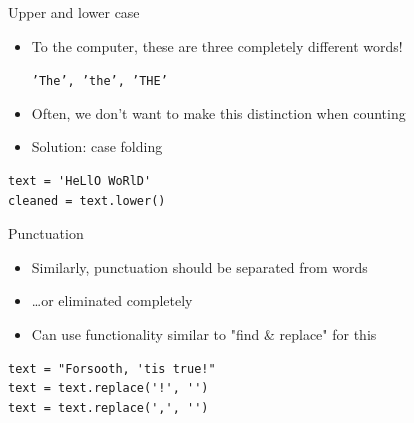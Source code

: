 \documentclass[aspectratio=169,usenames,dvipsnames]{beamer}
\begin{document}
% 
% 
% 
% 

\begin{frame}[fragile]{Upper and lower case}
    \begin{itemize}
        \item To the computer, these
            are three completely different words!

            \texttt{'The', 'the', 'THE'}
        \item Often, we don't want to make this distinction when counting
        \item Solution: case folding
    \end{itemize}
    \pause
\begin{lstlisting}
text = 'HeLlO WoRlD'
cleaned = text.lower()
\end{lstlisting}
\end{frame}

\begin{frame}[fragile]{Punctuation}
    \begin{itemize}
        \item Similarly, punctuation should be separated from words
        \item \dots or eliminated completely
        \item Can use functionality similar to "find \& replace" for this
    \end{itemize}
    \pause
\begin{lstlisting}
text = "Forsooth, 'tis true!"
text = text.replace('!', '')
text = text.replace(',', '')
\end{lstlisting}
\end{frame}
\end{document}
